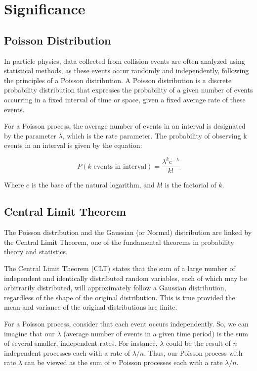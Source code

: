 \section{Significance}

\subsection{Poisson Distribution}

In particle physics, data collected from collision events are often analyzed using statistical methods, as these events
occur randomly and independently, following the principles of a Poisson distribution. A Poisson distribution is a
discrete probability distribution that expresses the probability of a given number of events occurring in a fixed
interval of time or space, given a fixed average rate of these events.

For a Poisson process, the average number of events in an interval is designated by the parameter $\lambda$, which is
the rate parameter. The probability of observing k events in an interval is given by the equation:

\begin{equation}
    P(k \text{ events in interval}) = \frac{\lambda^k e^{-\lambda}}{k!}
\end{equation}

Where $e$ is the base of the natural logarithm, and $k!$ is the factorial of $k$.

\subsection{Central Limit Theorem}

The Poisson distribution and the Gaussian (or Normal) distribution are linked by the Central Limit Theorem, one of the
fundamental theorems in probability theory and statistics.

The Central Limit Theorem (CLT) states that the sum of a large number of independent and identically distributed random
variables, each of which may be arbitrarily distributed, will approximately follow a Gaussian distribution, regardless
of the shape of the original distribution. This is true provided the mean and variance of the original distributions are
finite.

For a Poisson process, consider that each event occurs independently. So, we can imagine that our $\lambda$ (average
number of events in a given time period) is the sum of several smaller, independent rates. For instance, $\lambda$ could
be the result of $n$ independent processes each with a rate of $\lambda/n$. Thus, our Poisson process with rate
$\lambda$ can be viewed as the sum of $n$ Poisson processes each with a rate $\lambda/n$.

